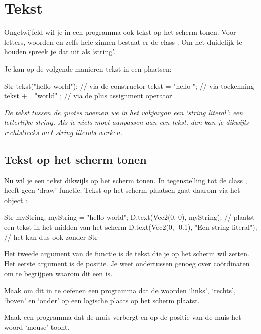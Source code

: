 \chapter{Tekst}

Ongetwijfeld wil je in een programma ook tekst op het scherm tonen. Voor letters, woorden en zelfs hele zinnen bestaat er de class . Om het duidelijk te houden spreek je dat uit als `string'.

Je kan op de volgende manieren tekst in een  plaatsen:

\begin{code}
Str tekst("hello world"); // via de constructor
tekst  = "hello "; // via toekenning
tekst += "world" ; // via de plus assignment operator
\end{code}

\textit{De tekst tussen de quotes noemen we in het vakjargon een `string literal': een letterlijke string. Als je niets moet aanpassen aan een tekst, dan kan je dikwijls rechtstreeks met string literals werken.}

\section{Tekst op het scherm tonen}
Nu wil je een tekst dikwijls op het scherm tonen. In tegenstelling tot de class , heeft  geen `draw' functie. Tekst op het scherm plaatsen gaat daarom via het object :

\begin{code}
Str myString;
myString = "hello world";
D.text(Vec2(0, 0), myString); // plaatst een tekst in het midden van het scherm
D.text(Vec2(0, -0.1), "Een string literal"); // het kan dus ook zonder Str
\end{code}

Het tweede argument van de functie  is de tekst die je op het scherm wil zetten. Het eerste argument is de positie. Je weet ondertussen genoeg over co\"ordinaten om te begrijpen waarom dit een  is.

\begin{exercise}
Maak om dit in te oefenen een programma dat de woorden `links', `rechts', `boven' en `onder' op een logische plaats op het scherm plaatst.
\end{exercise}

\begin{exercise}
Maak een programma dat de muis verbergt en op de positie van de muis het woord `mouse' toont.
\end{exercise}


